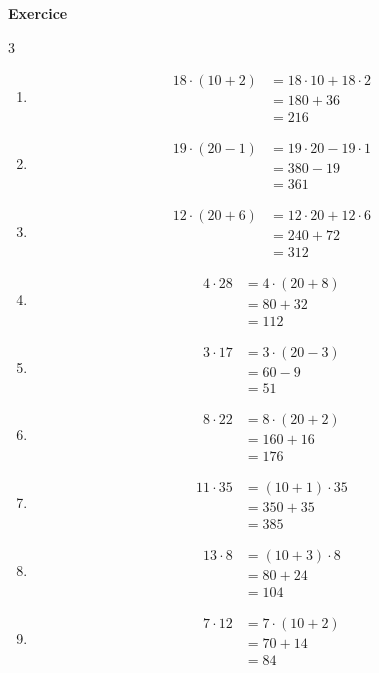 \documentclass[10pt,a4paper]{article}
\newcounter{nexo}
\begin{document}
\pagebreak
\setcounter{nexo}{1}
\textbf{Exercice \thenexo} 
\multicolsep\itemsep
\begin{multicols}{3}
	\begin{enumerate}
		\item 	\begin{align*} 
			18\cdot (10+2) &= 18 \cdot 10 + 18 \cdot 2 \\
		& = 180 + 36 \\
		& = 216
	\end{align*}
		\item \begin{align*}
			19 \cdot (20-1) &= 19 \cdot 20 - 19 \cdot 1 \\
			&= 380 - 19 \\
			&= 361
		\end{align*}
		\item \begin{align*}
			12 \cdot (20+6) &= 12\cdot 20 + 12 \cdot 6 \\ 
			&= 240 + 72 \\
			&= 312
		\end{align*}
		\item \begin{align*}
			4 \cdot 28 &= 4 \cdot (20 + 8) \\
			&= 80 + 32 \\
			&= 112 
		\end{align*}
		\item \begin{align*}
			3 \cdot 17 &= 3 \cdot (20-3) \\
			&= 60 - 9 \\
			&= 51
		\end{align*}
		\item \begin{align*}
			8 \cdot 22 &= 8 \cdot (20+2)\\
			&= 160 + 16 \\
			&= 176
		\end{align*}
		\item \begin{align*}
			11 \cdot 35 &= (10+1) \cdot 35 \\
			&= 350 + 35 \\
			&= 385
		\end{align*}
		\item \begin{align*}
			13\cdot 8 &= (10+3)\cdot 8 \\
			&= 80 + 24 \\
			&= 104
		\end{align*}
		\item \begin{align*}
			7 \cdot 12 &= 7\cdot (10+2)\\
			&= 70 + 14 \\
			&= 84
		\end{align*}
	\end{enumerate}
\end{multicols}
\end{document}

